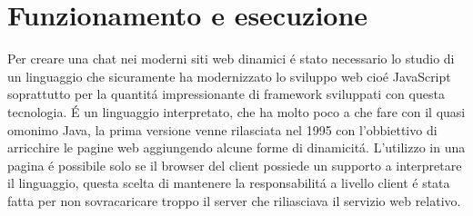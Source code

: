 \section{Funzionamento e esecuzione}

\iffalse
<studio di javascript>
\fi
Per creare una chat nei moderni siti web dinamici \'e stato necessario lo studio di un linguaggio che sicuramente ha modernizzato lo sviluppo web cio\'e JavaScript soprattutto per la quantit\'a impressionante di framework sviluppati con questa tecnologia.
\'E un linguaggio interpretato, che ha molto poco a che fare con il quasi omonimo Java, la prima versione venne rilasciata nel 1995 con l'obbiettivo di arricchire le pagine web aggiungendo alcune forme di dinamicit\'a. L'utilizzo in una pagina \'e possibile solo se il browser del client possiede un supporto a interpretare il linguaggio, questa scelta di mantenere la responsabilit\'a a livello client \'e stata fatta per non sovracaricare troppo il server che riliasciava il servizio web relativo.
 
